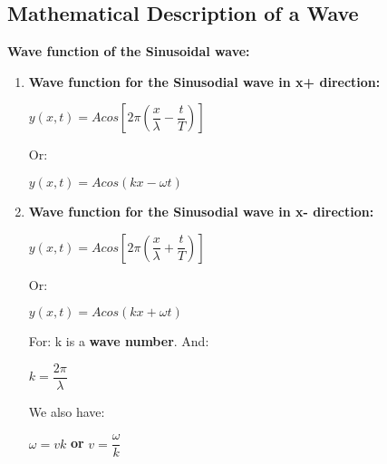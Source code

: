 \documentclass[10pt]{article}
\begin{document}
\bigbreak
\subsection{Mathematical Description of a Wave}
\textbf{Wave function of the Sinusoidal wave:}
\begin{enumerate}
	\item \textbf{Wave function for the Sinusodial wave in x+ direction:}
\begin{mybox}
	\begin{center}
		$y(x, t) = A cos \left[2 \pi \left(\dfrac{x}{\lambda} - \dfrac{t}{T} \right) \right]$
	\end{center}
\end{mybox}
Or: \\
\begin{mybox}
	\begin{center}
		$y(x, t) = A cos(kx - \omega t)$ \\
	\end{center}
\end{mybox}
	\item \textbf{Wave function for the Sinusodial wave in x- direction:}
	\begin{mybox}
	\begin{center}
		$y(x, t) = A cos \left[2 \pi \left(\dfrac{x}{\lambda} + \dfrac{t}{T} \right) \right]$
	\end{center}
\end{mybox}
Or: \\
\begin{mybox}
	\begin{center}
		$y(x, t) = A cos(kx + \omega t)$ \\
	\end{center}
\end{mybox}

For: k is a \textbf{wave number}. And: \\
\begin{mybox}
	\begin{center}
		$k = \dfrac{2 \pi}{\lambda}$
	\end{center}
\end{mybox}

\bigbreak
We also have: \\
\begin{mybox}
	\begin{center}
		$\omega = vk$ \textbf{or} $v = \dfrac{\omega}{k}$
	\end{center}
\end{mybox}


\end{enumerate}
\end{document}
